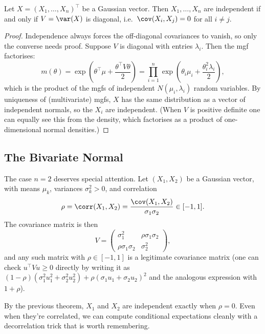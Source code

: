 \begin{theorem}
	Let $X = (X_1, \dots, X_n)^\top$ be a Gaussian vector. Then $X_1, \dots, X_n$ are independent if and only if $V = \var(X)$ is diagonal, i.e.\ $\cov(X_i, X_j) = 0$ for all $i \neq j$.
\end{theorem}
\begin{proof}
	Independence always forces the off-diagonal covariances to vanish, so only the converse needs proof. Suppose $V$ is diagonal with entries $\lambda_i$. Then the mgf factorises:
	$$
	m(\theta) = \exp\left(\theta^\top\mu + \frac{\theta^\top V \theta}{2}\right) = \prod_{i = 1}^{n} \exp\left(\theta_i \mu_i + \frac{\theta_i^2\lambda_i}{2}\right),
	$$
	which is the product of the mgfs of independent $N(\mu_i, \lambda_i)$ random variables. By uniqueness of (multivariate) mgfs, $X$ has the same distribution as a vector of independent normals, so the $X_i$ are independent. (When $V$ is positive definite one can equally see this from the density, which factorises as a product of one-dimensional normal densities.)
\end{proof}

\subsection{The Bivariate Normal}

The case $n = 2$ deserves special attention. Let $(X_1, X_2)$ be a Gaussian vector, with means $\mu_k$, variances $\sigma_k^2 > 0$, and correlation
$$
\rho = \corr(X_1, X_2) = \frac{\cov(X_1, X_2)}{\sigma_1 \sigma_2} \in [-1, 1].
$$
The covariance matrix is then
$$
V = \begin{pmatrix}
	\sigma_1^2 & \rho\sigma_1\sigma_2 \\
	\rho\sigma_1\sigma_2 & \sigma_2^2
\end{pmatrix},
$$
and any such matrix with $\rho \in [-1, 1]$ is a legitimate covariance matrix (one can check $u^\top V u \geq 0$ directly by writing it as $(1 - \rho)(\sigma_1^2 u_1^2 + \sigma_2^2 u_2^2) + \rho(\sigma_1 u_1 + \sigma_2 u_2)^2$ and the analogous expression with $1 + \rho$).

By the previous theorem, $X_1$ and $X_2$ are independent exactly when $\rho = 0$. Even when they're correlated, we can compute conditional expectations cleanly with a decorrelation trick that is worth remembering.

